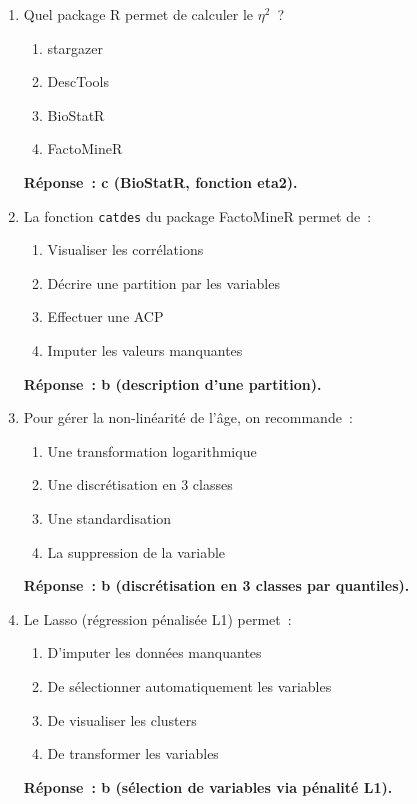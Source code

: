 \documentclass[a4paper,11pt]{article}
\theoremstyle{definition}
\theoremstyle{remark}
\begin{document}
\begin{enumerate}
  \item Quel package R permet de calculer le $\eta^2$~?
    \begin{enumerate}
      \item stargazer
      \item DescTools
      \item BioStatR
      \item FactoMineR
    \end{enumerate}
    \textbf{Réponse~: c (BioStatR, fonction eta2).}

  \item La fonction \texttt{catdes} du package FactoMineR permet de~:
    \begin{enumerate}
      \item Visualiser les corrélations
      \item Décrire une partition par les variables
      \item Effectuer une ACP
      \item Imputer les valeurs manquantes
    \end{enumerate}
    \textbf{Réponse~: b (description d'une partition).}

  \item Pour gérer la non-linéarité de l'âge, on recommande~:
    \begin{enumerate}
      \item Une transformation logarithmique
      \item Une discrétisation en 3 classes
      \item Une standardisation
      \item La suppression de la variable
    \end{enumerate}
    \textbf{Réponse~: b (discrétisation en 3 classes par quantiles).}

  \item Le Lasso (régression pénalisée L1) permet~:
    \begin{enumerate}
      \item D'imputer les données manquantes
      \item De sélectionner automatiquement les variables
      \item De visualiser les clusters
      \item De transformer les variables
    \end{enumerate}
    \textbf{Réponse~: b (sélection de variables via pénalité L1).}


\end{enumerate}
\end{document}
